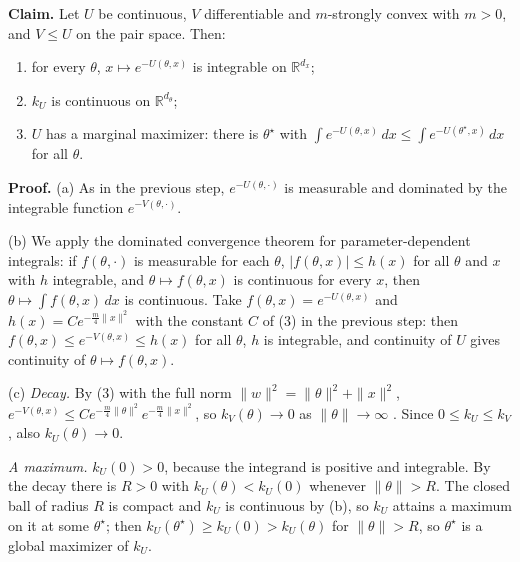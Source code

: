 \documentclass[11pt,a4paper]{article}
\begin{document}
\textbf{Claim.} Let \(U\) be continuous, \(V\) differentiable and \(m\)-strongly convex with \(m>0\), and \(V\le U\) on the pair space. Then:



\begin{enumerate}


\item for every \(\theta\), \(x\mapsto e^{-U(\theta,x)}\) is integrable on \(\mathbb R^{d_x}\);

\item \(k_U\) is continuous on \(\mathbb R^{d_\theta}\);

\item \(U\) has a marginal maximizer: there is \(\theta^\star\) with \(\int e^{-U(\theta,x)}\,dx\le\int e^{-U(\theta^\star,x)}\,dx\) for all \(\theta\).

\end{enumerate}



\textbf{Proof.} (a) As in the previous step, \(e^{-U(\theta,\cdot)}\) is measurable and dominated by the integrable function \(e^{-V(\theta,\cdot)}\).




(b) We apply the dominated convergence theorem for parameter-dependent integrals: if \(f(\theta,\cdot)\) is measurable for each \(\theta\), \(|f(\theta,x)|\le h(x)\) for all \(\theta\) and \(x\) with \(h\) integrable, and \(\theta\mapsto f(\theta,x)\) is continuous for every \(x\), then \(\theta\mapsto\int f(\theta,x)\,dx\) is continuous. Take \(f(\theta,x)=e^{-U(\theta,x)}\) and \(h(x)=Ce^{-\frac m4\|x\|^2}\) with the constant \(C\) of (3) in the previous step: then \(f(\theta,x)\le e^{-V(\theta,x)}\le h(x)\) for all \(\theta\), \(h\) is integrable, and continuity of \(U\) gives continuity of \(\theta\mapsto f(\theta,x)\).




(c) \emph{Decay.} By (3) with the full norm \(\|w\|^2=\|\theta\|^2+\|x\|^2\), \(e^{-V(\theta,x)}\le Ce^{-\frac m4\|\theta\|^2}e^{-\frac m4\|x\|^2}\), so \(k_V(\theta)\to0\) as \(\|\theta\|\to\infty\) \cite[Section~3.9.4]{LangevinLean2026IPLA}. Since \(0\le k_U\le k_V\), also \(k_U(\theta)\to0\).




\emph{A maximum.} \(k_U(0)>0\), because the integrand is positive and integrable. By the decay there is \(R>0\) with \(k_U(\theta)<k_U(0)\) whenever \(\|\theta\|>R\). The closed ball of radius \(R\) is compact and \(k_U\) is continuous by (b), so \(k_U\) attains a maximum on it at some \(\theta^\star\); then \(k_U(\theta^\star)\ge k_U(0)>k_U(\theta)\) for \(\|\theta\|>R\), so \(\theta^\star\) is a global maximizer of \(k_U\).
\end{document}
